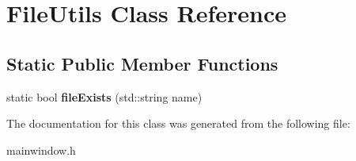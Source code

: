 \hypertarget{class_file_utils}{}\section{File\+Utils Class Reference}
\label{class_file_utils}
\subsection*{Static Public Member Functions}
\begin{DoxyCompactItemize}
\item 
static bool {\bfseries file\+Exists} (std\+::string name)\hypertarget{class_file_utils_a96bf6440f1dd2d7d3a19518e3606f10b}{}\label{class_file_utils_a96bf6440f1dd2d7d3a19518e3606f10b}

\end{DoxyCompactItemize}


The documentation for this class was generated from the following file\+:\begin{DoxyCompactItemize}
\item 
mainwindow.\+h\end{DoxyCompactItemize}
